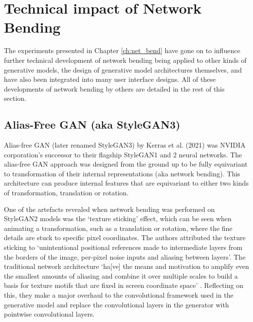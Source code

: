 \section{Technical impact of Network Bending}
\label{c7:sec:net-bend-impact}

The experiments presented in Chapter \ref{ch:net_bend} have gone on to influence further technical development of network bending being applied to other kinds of generative models, the design of generative model architectures themselves, and have also been integrated into many user interface designs. All of these developments of network bending by others are detailed in the rest of this section.

 \subsection{Alias-Free GAN (aka StyleGAN3)}

 Alias-free GAN (later renamed StyleGAN3) by Kerras et al. (2021) was NVIDIA corporation's successor to their flagship StyleGAN1 and 2 neural networks. 
 The alias-free GAN approach was designed from the ground up to be fully equivariant to transformation of their internal representations (aka network bending). 
 This architecture can produce internal features that are equivariant to either two kinds of transformation, translation or rotation. 

 One of the artefacts revealed when network bending was performed on StyleGAN2 models was the ‘texture sticking’ effect, which can be seen when animating a transformation, such as a translation or rotation, where the fine details are stuck to specific pixel coordinates. 
 The authors attributed the texture sticking to `unintentional positional references made to intermediate layers from the borders of the image, per-pixel noise inputs and aliasing between layers'. 
 The traditional network architecture `ha[ve] the means and motivation to amplify even the smallest amounts of aliasing and combine it over multiple scales to build a basis for texture motifs that are fixed in screen coordinate space' \citep{karras2021alias}.
 Reflecting on this, they make a major overhaul to the convolutional framework used in the generative model and replace the convolutional layers in the generator with pointwise convolutional layers.

